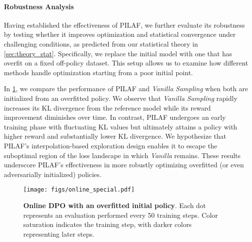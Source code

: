 \paragraph{Robustness Analysis} Having established the effectiveness of PILAF, we further evaluate its robustness by testing whether it improves optimization and statistical convergence under challenging conditions, as predicted from our statistical theory in \cref{sec:theory_stat}. Specifically, we replace the initial model with one that has overfit on a fixed off-policy dataset. This setup allows us to examine how different methods handle optimization starting from a poor initial point.

In \cref{fig:online_dpo_special}, we compare the performance of PILAF and \textit{Vanilla Sampling} when both are initialized from an overfitted policy. We observe that \textit{Vanilla Sampling} rapidly increases its KL divergence from the reference model while its reward improvement diminishes over time. In contrast, PILAF undergoes an early training phase with fluctuating KL values but ultimately attains a policy with higher reward and substantially lower KL divergence. We hypothesize that PILAF’s interpolation-based exploration design enables it to escape the suboptimal region of the loss landscape in which \textit{Vanilla} remains. These results underscore PILAF’s effectiveness in more robustly optimizing overfitted (or even adversarially initialized) policies. 

\begin{figure}[htb]
    \centering
    \vspace{-1em}
    \texttt{[image: figs/online\_special.pdf]}
    \caption{\textbf{Online DPO with an overfitted initial policy}. Each dot represents an evaluation performed every 50 training steps. Color saturation indicates the training step, with darker colors representing later steps.}
    \label{fig:online_dpo_special}
\end{figure}






